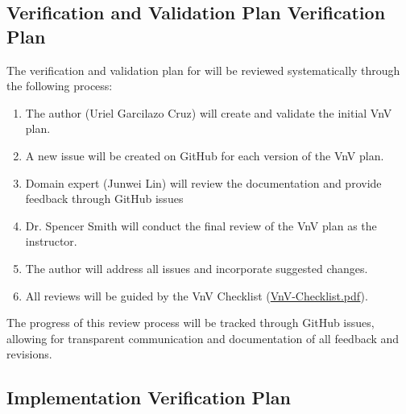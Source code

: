 \documentclass[12pt, titlepage]{article}
\begin{document}



\subsection{Verification and Validation Plan Verification Plan}


The verification and validation plan for \progname{} will be reviewed systematically through the following process:

\begin{enumerate}
  \item The author (Uriel Garcilazo Cruz) will create and validate the initial VnV plan.
  \item A new issue will be created on GitHub for each version of the VnV plan.
  \item Domain expert (Junwei Lin) will review the documentation and provide feedback through GitHub issues
  \item Dr. Spencer Smith will conduct the final review of the VnV plan as the instructor.
  \item The author will address all issues and incorporate suggested changes.
  \item All reviews will be guided by the VnV Checklist (\href{https://github.com/UGarCil/UGarcil_capstone/blob/main/docs/Checklists/VnV-Checklist.pdf}{VnV-Checklist.pdf}).
\end{enumerate}
The progress of this review process will be tracked through GitHub issues, allowing for transparent communication and documentation of all feedback and revisions.



\subsection{Implementation Verification Plan}
\end{document}
